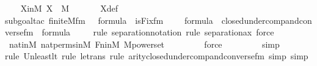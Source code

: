 \begin{isabellebody}
\isanewline
\ \ \isamarkupfalse%
\ XinM{\isacharcolon}{\kern0pt}\ {\isachardoublequoteopen}X\ {\isasymin}\ M{\isachardoublequoteclose}\ \isanewline
\ \ \ \ \isamarkupfalse%
\ X{\isacharunderscore}{\kern0pt}def\isanewline
\ \ \ \ \ \ \ \isamarkupfalse%
{\isacharparenleft}{\kern0pt}subgoal{\isacharunderscore}{\kern0pt}tac\ {\isachardoublequoteopen}finite{\isacharunderscore}{\kern0pt}M{\isacharunderscore}{\kern0pt}fm{\isacharparenleft}{\kern0pt}{}{\isacharcomma}{\kern0pt}\ {}{\isacharparenright}{\kern0pt}\ {\isasymin}\ formula\ {\isasymand}\ is{\isacharunderscore}{\kern0pt}Fix{\isacharunderscore}{\kern0pt}fm{\isacharparenleft}{\kern0pt}{}{\isacharcomma}{\kern0pt}\ {}{\isacharcomma}{\kern0pt}\ {}{\isacharcomma}{\kern0pt}\ {}{\isacharparenright}{\kern0pt}\ {\isasymin}\ formula\ {\isasymand}\ closed{\isacharunderscore}{\kern0pt}under{\isacharunderscore}{\kern0pt}comp{\isacharunderscore}{\kern0pt}and{\isacharunderscore}{\kern0pt}converse{\isacharunderscore}{\kern0pt}fm{\isacharparenleft}{\kern0pt}{}{\isacharparenright}{\kern0pt}\ {\isasymin}\ formula{\isachardoublequoteclose}{\isacharparenright}{\kern0pt}\isanewline
\ \ \ \ \isamarkupfalse%
{\isacharparenleft}{\kern0pt}rule\ separation{\isacharunderscore}{\kern0pt}notation{\isacharcomma}{\kern0pt}\ rule\ separation{\isacharunderscore}{\kern0pt}ax{\isacharcomma}{\kern0pt}\ force{\isacharparenright}{\kern0pt}\isanewline
\ \ \ \ \isamarkupfalse%
\ nat{\isacharunderscore}{\kern0pt}in{\isacharunderscore}{\kern0pt}M\ nat{\isacharunderscore}{\kern0pt}perms{\isacharunderscore}{\kern0pt}in{\isacharunderscore}{\kern0pt}M\ Fn{\isacharunderscore}{\kern0pt}in{\isacharunderscore}{\kern0pt}M\ M{\isacharunderscore}{\kern0pt}powerset\ \isanewline
\ \ \ \ \ \ \isamarkupfalse%
\ force\ \isanewline
\ \ \ \ \ \ \isamarkupfalse%
\ simp\isanewline
\ \ \ \ \ \ \isamarkupfalse%
{\isacharparenleft}{\kern0pt}rule\ Un{\isacharunderscore}{\kern0pt}least{\isacharunderscore}{\kern0pt}lt{\isacharcomma}{\kern0pt}\ rule\ le{\isacharunderscore}{\kern0pt}trans{\isacharcomma}{\kern0pt}\ rule\ arity{\isacharunderscore}{\kern0pt}closed{\isacharunderscore}{\kern0pt}under{\isacharunderscore}{\kern0pt}comp{\isacharunderscore}{\kern0pt}and{\isacharunderscore}{\kern0pt}converse{\isacharunderscore}{\kern0pt}fm{\isacharcomma}{\kern0pt}\ simp{\isacharcomma}{\kern0pt}\ simp{\isacharparenright}{\kern0pt}\isanewline
\ \ \ \ \ \ \isamarkupfalse%

\end{isabellebody}
